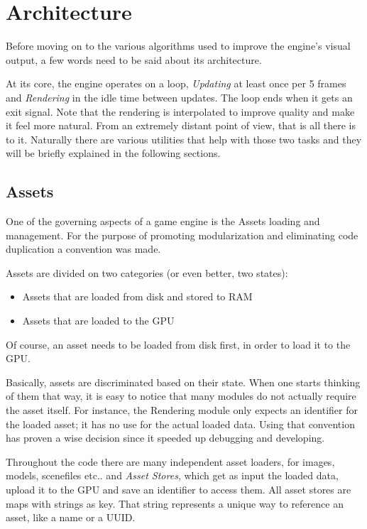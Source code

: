 \section{Architecture}
Before moving on to the various algorithms used to improve the engine's visual output, a few
words need to be said about its architecture.

At its core, the engine operates on a loop, \textit{Updating} at least once per 5 frames 
and \textit{Rendering} in the idle time between updates. The loop ends when it gets an exit
signal. Note that the rendering is interpolated to improve quality and make it feel more natural.
From an extremely distant point of view, that is all there is to it. Naturally there are various
utilities that help with those two tasks and they will be briefly explained in the following
sections.

\subsection{Assets}
One of the governing aspects of a game engine is the Assets loading and management. For the
purpose of promoting modularization and eliminating code duplication a convention was made.

\noindent Assets are divided on two categories (or even better, two states):

\begin{itemize}
\item Assets that are loaded from disk and stored to RAM
\item Assets that are loaded to the GPU
\end{itemize}

\noindent Of course, an asset needs to be loaded from disk first, in order to load it to the GPU\@.

Basically, assets are discriminated based on their state. When one starts thinking of them that
way, it is easy to notice that many modules do not actually require the asset itself. For
instance, the Rendering module only expects an identifier for the loaded asset; it has no use
for the actual loaded data. Using that convention has proven a wise decision since it speeded
up debugging and developing.

Throughout the code there are many independent asset loaders, for images, models, scenefiles etc..
and \textit{Asset Stores}, which get as input the loaded data, upload it to the GPU and save an
identifier to access them. All asset stores are maps with strings as key. That string represents
a unique way to reference an asset, like a name or a UUID\@.
